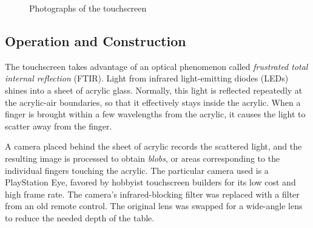 \documentclass[a4paper,11pt]{article}
\begin{document}
\begin{figure}[p]
\hspace{1em}
\caption{Photographs of the touchscreen}
\label{fig:hw-photos}
\end{figure}

\subsection{Operation and Construction}

The touchscreen takes advantage of an optical phenomenon called
\emph{frustrated total internal reflection} (FTIR).
Light from infrared light-emitting diodes (LEDs) shines into a sheet of acrylic
glass.
Normally, this light is reflected repeatedly at the acrylic-air boundaries, so
that it effectively stays inside the acrylic.
When a finger is brought within a few wavelengths from the acrylic, it causes
the light to scatter away from the finger.

A camera placed behind the sheet of acrylic records the scattered light, and
the resulting image is processed to obtain \emph{blobs}, or areas corresponding
to the individual fingers touching the acrylic.
The particular camera used is a PlayStation Eye, favored by hobbyist
touchscreen builders for its low cost and high frame rate. %
The camera's infrared-blocking filter was replaced with a filter from an old
remote control.
The original lens was swapped for a wide-angle lens to reduce the needed depth
of the table.
\end{document}

